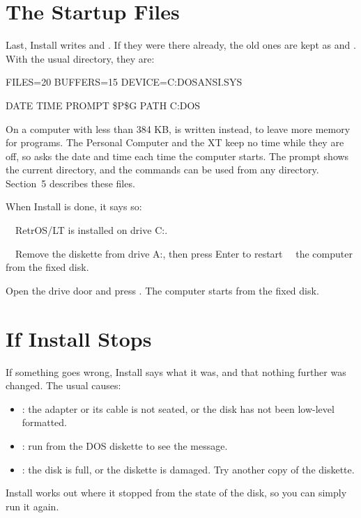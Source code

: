 \section{The Startup Files}

Last, Install writes  and
. If they were there already, the old ones are
kept as  and . With the usual
directory, they are:

\begin{dialogue}
FILES=20
BUFFERS=15
DEVICE=C:\bs{}DOS\bs{}ANSI.SYS
\end{dialogue}

\begin{dialogue}
DATE
TIME
PROMPT \$P\$G
PATH C:\bs{}DOS
\end{dialogue}

On a computer with less than 384 KB,  is written
instead, to leave more memory for programs. The Personal Computer and the
XT keep no time while they are off, so  asks the date
and time each time the computer starts. The prompt shows the current
directory, and the commands can be used from any directory. Section~5
describes these files.

When Install is done, it says so:

\begin{dialogue}
\ \ RetrOS/LT is installed on drive C:.

\ \ Remove the diskette from drive A:, then press Enter to restart
\ \ the computer from the fixed disk.
\end{dialogue}

Open the drive door and press . The computer starts from the
fixed disk.

\section{If Install Stops}

If something goes wrong, Install says what it was, and that nothing
further was changed. The usual causes:

\begin{itemize}
\item {}: the adapter or its cable
  is not seated, or the disk has not been low-level formatted.
\item {}: run 
  from the DOS diskette to see the message.
\item {}: the disk is full, or
  the diskette is damaged. Try another copy of the diskette.
\end{itemize}

Install works out where it stopped from the state of the disk, so you can
simply run it again.
